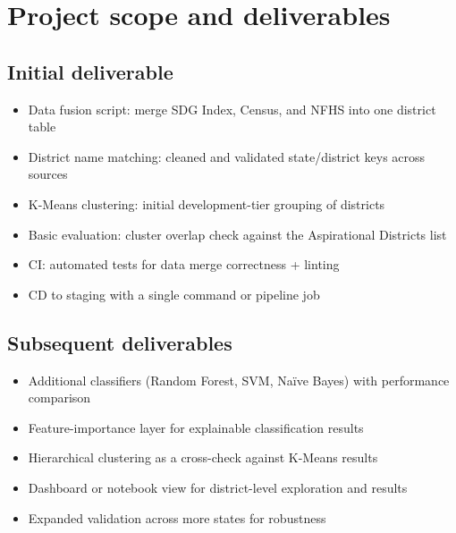 \documentclass[11pt,a4paper]{article}
\newcommand{\BvrHint}[1]{%
  {\normalfont\normalsize\itshape\hfill #1}}
\begin{document}
\section{Project scope and deliverables %
}
\subsection{Initial deliverable %
}
\begin{itemize}[leftmargin=0.7cm]
    \item Data fusion script: merge SDG Index, Census, and NFHS into one district table
    \item District name matching: cleaned and validated state/district keys across sources
    \item K-Means clustering: initial development-tier grouping of districts
    \item Basic evaluation: cluster overlap check against the Aspirational Districts list
    \item CI: automated tests for data merge correctness + linting
    \item CD to staging with a single command or pipeline job
\end{itemize}

\subsection{Subsequent deliverables}
\begin{itemize}[leftmargin=0.7cm]
    \item Additional classifiers (Random Forest, SVM, Naïve Bayes) with performance comparison
    \item Feature-importance layer for explainable classification results
    \item Hierarchical clustering as a cross-check against K-Means results
    \item Dashboard or notebook view for district-level exploration and results
    \item Expanded validation across more states for robustness
\end{itemize}
\end{document}
